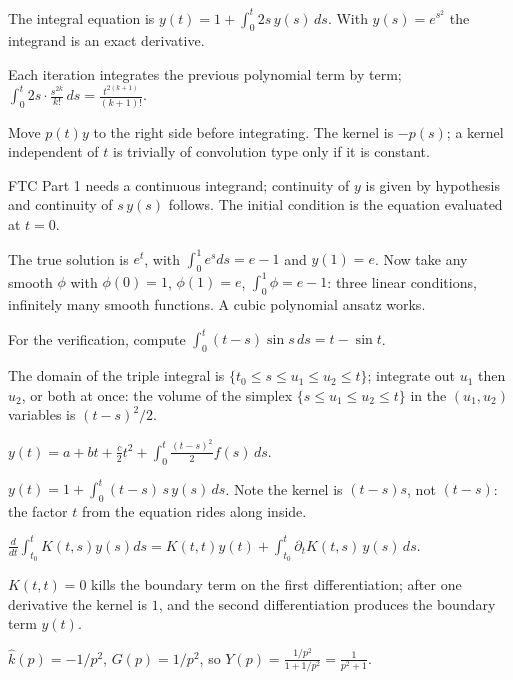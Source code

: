 \documentclass{essay}
\begin{document}
\begin{description}[leftmargin=0pt, itemsep=4pt]
  \item[\ref{ex:basic}.] The integral equation is $y(t) = 1 + \int_0^t 2s\,y(s)\,ds$. With $y(s) = e^{s^2}$ the integrand is an exact derivative.
  \item[\ref{ex:picard}.] Each iteration integrates the previous polynomial term by term; $\int_0^t 2s \cdot \frac{s^{2k}}{k!}\, ds = \frac{t^{2(k+1)}}{(k+1)!}$.
  \item[\ref{ex:linear}.] Move $p(t)y$ to the right side before integrating. The kernel is $-p(s)$; a kernel independent of $t$ is trivially of convolution type only if it is constant.
  \item[\ref{ex:backward}.] FTC Part 1 needs a continuous integrand; continuity of $y$ is given by hypothesis and continuity of $s\,y(s)$ follows. The initial condition is the equation evaluated at $t = 0$.
  \item[\ref{ex:wrongway}.] The true solution is $e^t$, with $\int_0^1 e^s ds = e - 1$ and $y(1) = e$. Now take any smooth $\phi$ with $\phi(0)=1$, $\phi(1)=e$, $\int_0^1 \phi = e - 1$: three linear conditions, infinitely many smooth functions. A cubic polynomial ansatz works.
  \item[\ref{ex:sine}.] For the verification, compute $\int_0^t (t-s)\sin s\, ds = t - \sin t$.
  \item[\ref{ex:cauchy3}.] The domain of the triple integral is $\{t_0 \le s \le u_1 \le u_2 \le t\}$; integrate out $u_1$ then $u_2$, or both at once: the volume of the simplex $\{s \le u_1 \le u_2 \le t\}$ in the $(u_1, u_2)$ variables is $(t-s)^2/2$.
  \item[\ref{ex:thirdorder}.] $y(t) = a + bt + \tfrac{c}{2}t^2 + \int_0^t \frac{(t-s)^2}{2} f(s)\, ds$.
  \item[\ref{ex:airy}.] $y(t) = 1 + \int_0^t (t-s)\,s\,y(s)\,ds$. Note the kernel is $(t-s)s$, not $(t-s)$: the factor $t$ from the equation rides along inside.
  \item[\ref{ex:leibniz}.] $\frac{d}{dt}\int_{t_0}^t K(t,s)y(s)ds = K(t,t)y(t) + \int_{t_0}^t \partial_t K(t,s)\, y(s)\, ds$.
  \item[\ref{ex:twoderivs}.] $K(t,t) = 0$ kills the boundary term on the first differentiation; after one derivative the kernel is $1$, and the second differentiation produces the boundary term $y(t)$.
  \item[\ref{ex:convolution}.] $\widehat{k}(p) = -1/p^2$, $G(p) = 1/p^2$, so $Y(p) = \frac{1/p^2}{1 + 1/p^2} = \frac{1}{p^2 + 1}$.

\end{description}
\end{document}
